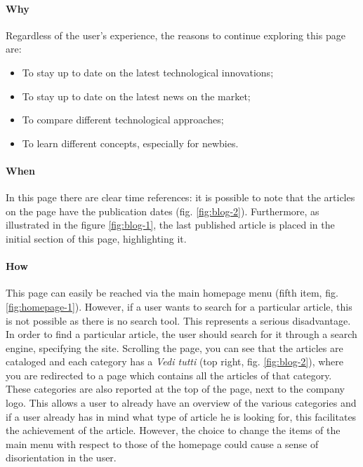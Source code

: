 \paragraph{Why}

Regardless of the user's experience, the reasons to continue exploring 
this page are:
\begin{itemize}
  \item To stay up to date on the latest technological innovations;
  \item To stay up to date on the latest news on the market;
  \item To compare different technological approaches;
  \item To learn different concepts, especially for newbies.
\end{itemize}

\paragraph{When}

In this page there are clear time references: it is possible to note that 
the articles on the page have the publication dates (fig. 
\ref{fig:blog-2}). Furthermore, as illustrated in the figure 
\ref{fig:blog-1}, the last published article is placed in the initial 
section of this page, highlighting it. 

\paragraph{How}

This page can easily be reached via the main homepage menu (fifth item, 
fig. \ref{fig:homepage-1}). However, if a user wants to search for a 
particular article, this is not possible as there is no search tool. This 
represents a serious disadvantage. In order to find a particular article, 
the user should search for it through a search engine, specifying the 
site. Scrolling the page, you can see that the articles are cataloged and 
each category has a \textit{Vedi tutti} (top right, fig. 
\ref{fig:blog-2}), where you are redirected to a page which contains all 
the articles of that category. These categories are also reported at the 
top of the page, next to the company logo. This allows a user to already 
have an overview of the various categories and if a user already has in 
mind what type of article he is looking for, this facilitates the 
achievement of the article. However, the choice to change the items of the 
main menu with respect to those of the homepage could cause a sense of 
disorientation in the user.

